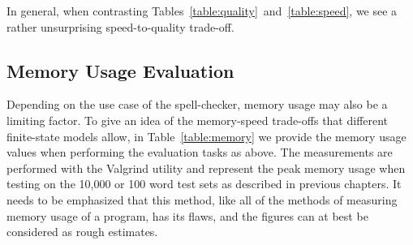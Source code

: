 \documentclass[a4paper,12pt]{article}
\begin{document}
In general, when contrasting
Tables~\ref{table:quality}~and~\ref{table:speed}, we see a rather unsurprising
speed-to-quality trade-off.


%

\subsection{Memory Usage Evaluation}

Depending on the use case of the spell-checker, memory usage may also be a
limiting factor. To give an idea of the memory-speed trade-offs that
different finite-state models allow, in Table~\ref{table:memory} we provide
the memory usage values when performing the evaluation tasks as above. The
measurements are performed with the Valgrind utility and represent the peak
memory usage when testing on the 10,000 or 100 word test sets as described in
previous chapters. It needs to be emphasized that this method, like all of
the methods of measuring memory usage of a program, has its flaws, and the
figures can at best be considered as rough estimates.
\end{document}
